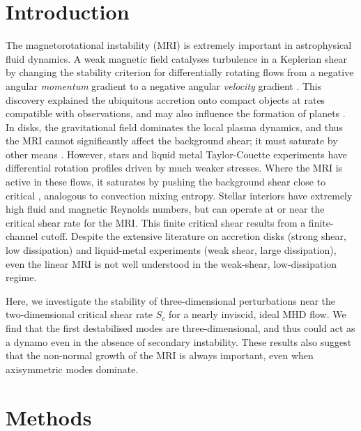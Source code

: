 \documentclass[openacc]{rsproca_new}%
\begin{document}
\maketitle

\section{Introduction}
The magnetorotational instability (MRI) is extremely important in astrophysical fluid dynamics.
A weak magnetic field catalyses turbulence in a Keplerian shear by changing the stability criterion for differentially rotating flows from a negative angular \emph{momentum} gradient to a negative angular \emph{velocity} gradient \cite{1998RvMP...70....1B,2010RSPTA.368.1607J}.
This discovery explained the ubiquitous accretion onto compact objects at rates compatible with observations, and may also influence the formation of planets \cite{2007Natur.448.1022J}.
In disks, the gravitational field dominates the local plasma dynamics, and thus the MRI cannot significantly affect the background shear; it must saturate by other means \cite{2018MNRAS.474.3451X}.
However, stars and liquid metal Taylor-Couette experiments have differential rotation profiles driven by much weaker stresses.
Where the MRI is active in these flows, it saturates by pushing the background shear close to critical \cite{2015RSPSA.47140699V,2017ApJ...841....1C,2017ApJ...841....2C}, analogous to convection mixing entropy.
Stellar interiors have extremely high fluid and magnetic Reynolds numbers, but can operate at or near the critical shear rate for the MRI.
This finite critical shear results from a finite-channel cutoff.
Despite the extensive literature on accretion disks (strong shear, low dissipation) and liquid-metal experiments (weak shear, large dissipation), even the linear MRI is not well understood in the weak-shear, low-dissipation regime. 

Here, we investigate the stability of three-dimensional perturbations near the two-dimensional critical shear rate $S_{c}$ for a nearly inviscid, ideal MHD flow.
We find that the first destabilised modes are three-dimensional, and thus could act as a dynamo even in the absence of secondary instability.
These results also suggest that the non-normal growth of the MRI is always important, even when axisymmetric modes dominate.

\section{Methods}
\label{sec:methods}
\end{document}
